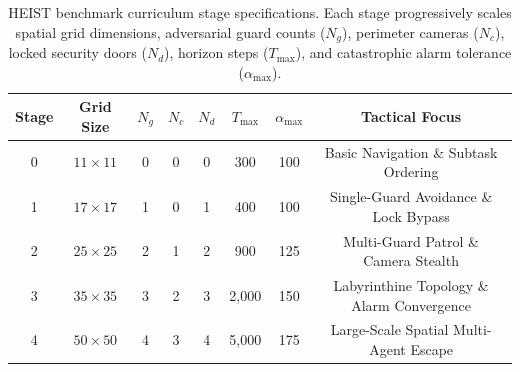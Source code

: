\begin{table}[t]
\centering
\caption{HEIST benchmark curriculum stage specifications. Each stage progressively scales spatial grid dimensions, adversarial guard counts ($N_g$), perimeter cameras ($N_c$), locked security doors ($N_d$), horizon steps ($T_{\max}$), and catastrophic alarm tolerance ($\alpha_{\max}$).}
\label{tab:stage_specs}
\vspace{0.06in}
\small
\setlength{\tabcolsep}{4.5pt}
\renewcommand{\arraystretch}{1.08}
\begin{tabular}{cccccccc}
\toprule
\textbf{Stage} & \textbf{Grid Size} & $N_g$ & $N_c$ & $N_d$ & $T_{\max}$ & $\alpha_{\max}$ & \textbf{Tactical Focus} \\
\midrule
0 & $11\times11$ & 0 & 0 & 0 & 300 & 100 & Basic Navigation \& Subtask Ordering \\
1 & $17\times17$ & 1 & 0 & 1 & 400 & 100 & Single-Guard Avoidance \& Lock Bypass \\
2 & $25\times25$ & 2 & 1 & 2 & 900 & 125 & Multi-Guard Patrol \& Camera Stealth \\
3 & $35\times35$ & 3 & 2 & 3 & 2,000 & 150 & Labyrinthine Topology \& Alarm Convergence \\
4 & $50\times50$ & 4 & 3 & 4 & 5,000 & 175 & Large-Scale Spatial Multi-Agent Escape \\
\bottomrule
\end{tabular}
\end{table}
